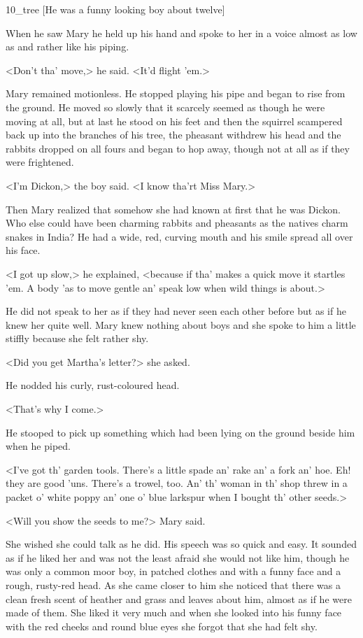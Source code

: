 \begin{colorbigpic}
	[\basicscale]
	{10_tree}
	[He was a funny looking boy about twelve]
\end{colorbigpic}


When he saw Mary he held up his hand and spoke to her in a voice almost as low as and rather like his piping.

<Don't tha' move,> he said. <It'd flight 'em.>

Mary remained motionless. He stopped playing his pipe and began to rise from the ground. He moved so slowly that it scarcely seemed as though he were moving at all, but at last he stood on his feet and then the squirrel scampered back up into the branches of his tree, the pheasant withdrew his head and the rabbits dropped on all fours and began to hop away, though not at all as if they were frightened.

<I'm Dickon,> the boy said. <I know tha'rt Miss Mary.>

Then Mary realized that somehow she had known at first that he was Dickon. Who else could have been charming rabbits and pheasants as the natives charm snakes in India? He had a wide, red, curving mouth and his smile spread all over his face.

<I got up slow,> he explained, <because if tha' makes a quick move it startles 'em. A body 'as to move gentle an' speak low when wild things is about.>

He did not speak to her as if they had never seen each other before but as if he knew her quite well. Mary knew nothing about boys and she spoke to him a little stiffly because she felt rather shy.

<Did you get Martha's letter?> she asked.

He nodded his curly, rust-coloured head.

<That's why I come.>

He stooped to pick up something which had been lying on the ground beside him when he piped.

<I've got th' garden tools. There's a little spade an' rake an' a fork an' hoe. Eh! they are good 'uns. There's a trowel, too. An' th' woman in th' shop threw in a packet o' white poppy an' one o' blue larkspur when I bought th' other seeds.>

<Will you show the seeds to me?> Mary said.

She wished she could talk as he did. His speech was so quick and easy. It sounded as if he liked her and was not the least afraid she would not like him, though he was only a common moor boy, in patched clothes and with a funny face and a rough, rusty-red head. As she came closer to him she noticed that there was a clean fresh scent of heather and grass and leaves about him, almost as if he were made of them. She liked it very much and when she looked into his funny face with the red cheeks and round blue eyes she forgot that she had felt shy.


